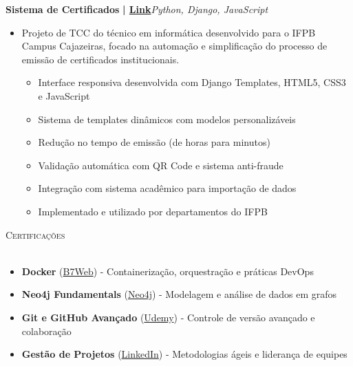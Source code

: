 \documentclass[a4paper]{article}
\newcommand{\lineunder}{
    \vspace*{-8pt} \\
    \hspace*{-18pt} \hrulefill \\
}
\newcommand{\header}[1]{
    {\hspace*{-18pt}\vspace*{6pt} \textsc{#1}}
    \vspace*{-6pt} \lineunder
}
\begin{document}
{\textbf{Sistema de Certificados}}\textbf{ | \href{https://github.com/bodescorp/Cext-final-}{Link}}\hfill{\sl Python, Django, JavaScript}\\
\vspace{-3mm}
\begin{itemize} \itemsep -3pt
    \item[] Projeto de TCC do técnico em informática desenvolvido para o IFPB Campus Cajazeiras, focado na automação e simplificação do processo de emissão de certificados institucionais.
        \begin{itemize}
            \item Interface responsiva desenvolvida com Django Templates, HTML5, CSS3 e JavaScript
            \item Sistema de templates dinâmicos com modelos personalizáveis
            \item Redução no tempo de emissão (de horas para minutos)
            \item Validação automática com QR Code e sistema anti-fraude
            \item Integração com sistema acadêmico para importação de dados
            \item Implementado e utilizado por departamentos do IFPB
        \end{itemize}
\end{itemize}
\vspace*{2mm}

%
%
\header{Certificações}
\vspace{1mm}
\begin{itemize}[leftmargin=*] \itemsep -2pt    
    \item \textbf{Docker} (\href{https://drive.google.com/drive/folders/1YKThgvnT5h1bA_Hb0uDiIf7p8Qiph-NC}{B7Web})
    - Containerização, orquestração e práticas DevOps
    
    \item \textbf{Neo4j Fundamentals} (\href{https://graphacademy.neo4j.com/c/9d25b259-5995-4053-8475-7b2bf61f163e/}{Neo4j})
    - Modelagem e análise de dados em grafos
    
    \item \textbf{Git e GitHub Avançado} (\href{https://www.udemy.com/certificate/UC-db57cce7-1471-47ff-9828-0e3a4d7da628/}{Udemy})
    - Controle de versão avançado e colaboração
    
    \item \textbf{Gestão de Projetos} (\href{https://www.linkedin.com/learning/certificates/0fc1a744c87dc72f53e8c694fd58809808a183327167377cb224c1ac43e732b6}{LinkedIn})
    - Metodologias ágeis e liderança de equipes
\end{itemize}
\end{document}
